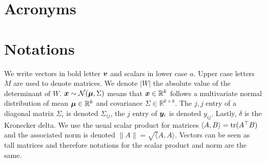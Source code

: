     \chapter*{Acronyms}
    \begin{acronym}[UMLX]
    \end{acronym}

    \chapter*{Notations}
    We write vectors in bold letter $\boldsymbol{v}$ and scalars in lower case $a$. Upper case letters $M$ are used to denote
    matrices. We denote $|W|$ the absolute value of the determinant of $W$. $\boldsymbol{x} \sim \mathcal{N}(\boldsymbol{\mu}, \Sigma)$ means that $\boldsymbol{x} \in \mathbb{R}^k$ follows
    a multivariate normal distribution of mean $\boldsymbol{\mu} \in \mathbb{R}^k$ and
    covariance $\Sigma \in \mathbb{R}^{k \times k}$. The $j, j$ entry of a diagonal matrix $\Sigma_i$ is denoted $\Sigma_{ij}$, the $j$ entry of $\boldsymbol{y}_i$ is denoted $y_{ij}$. Lastly, $\delta$ is the Kronecker delta.
    We use the usual scalar product for matrices $\langle A , B\rangle =
    \mathop{\mathrm{tr}}(A^{\top} B)$ and the associated norm is denoted $\|A\| = \sqrt \langle
    A, A \rangle$. Vectors can be seen as tall matrices and therefore notations for
    the scalar product and norm are the same.
\endgroup
